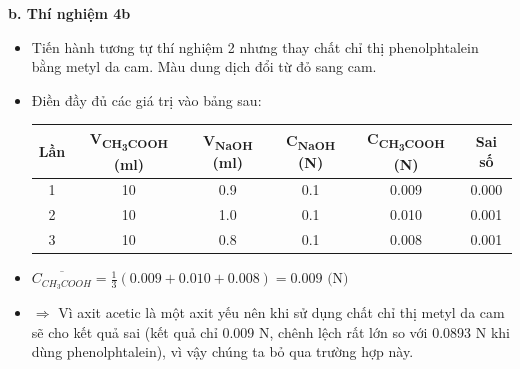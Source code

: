 \textbf{b. Thí nghiệm 4b}
\begin{itemize}
    \item Tiến hành tương tự thí nghiệm 2 nhưng thay chất chỉ thị phenolphtalein bằng metyl da cam. Màu dung dịch đổi từ đỏ sang cam.
    \item Điền đầy đủ các giá trị vào bảng sau:
    \begin{table}[H]
        \centering
        \begin{tabular}{|c|c|c|c|c|c|}
            \hline
            \textbf{Lần} & \textbf{V\textsubscript{CH\textsubscript{3}COOH} (ml)} & \textbf{V\textsubscript{NaOH} (ml)} & \textbf{C\textsubscript{NaOH} (N)} & \textbf{C\textsubscript{CH\textsubscript{3}COOH} (N)} & \textbf{Sai số} \\
            \hline
            1 & 10 & 0.9 & 0.1 & 0.009 & 0.000 \\
            \hline
            2 & 10 & 1.0 & 0.1 & 0.010 & 0.001 \\
            \hline
            3 & 10 & 0.8 & 0.1 & 0.008 & 0.001 \\
            \hline
        \end{tabular}
    \end{table}
    \item $\overline{C_{CH_3COOH}} = \frac{1}{3}(0.009 + 0.010 + 0.008) = 0.009 \text{ (N)}$
    \item $\Rightarrow$ Vì axit acetic là một axit yếu nên khi sử dụng chất chỉ thị metyl da cam sẽ cho kết quả sai (kết quả chỉ 0.009 N, chênh lệch rất lớn so với 0.0893 N khi dùng phenolphtalein), vì vậy chúng ta bỏ qua trường hợp này.
\end{itemize}

